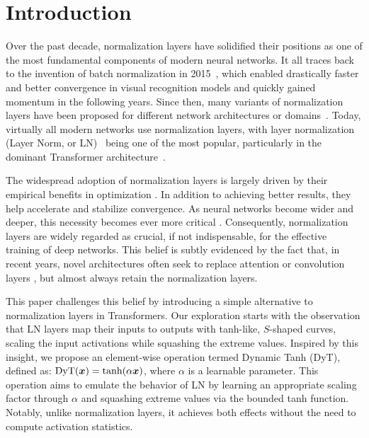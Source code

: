 




\section{Introduction}


Over the past decade, normalization layers have solidified their positions as one of the most fundamental components of modern neural networks.
It all traces back to the invention of batch normalization in 2015~\citep{ioffe2015batch}, which enabled drastically faster and better convergence in visual recognition models and quickly gained momentum in the following years.
Since then, many variants of normalization layers have been proposed for different network architectures or domains~\citep{ba2016layer,ulyanov2016instance,wu2018group,zhang2019root}.
Today, virtually all modern networks use normalization layers, with layer normalization (Layer Norm, or LN)~\citep{ba2016layer} being one of the most popular, particularly in the dominant Transformer architecture~\citep{vaswani2017attention, dosovitskiy2020image}.



The widespread adoption of normalization layers is largely driven by their empirical benefits in optimization \citep{santurkar2018does, bjorck2018understanding}.
In addition to achieving better results, they help accelerate and stabilize convergence.
As neural networks become wider and deeper, this necessity becomes ever more critical \citep{brock2021characterizing, huang2023normalization}.
Consequently, normalization layers are widely regarded as crucial, if not indispensable, for the effective training of deep networks.
This belief is subtly evidenced by the fact that, in recent years, novel architectures often seek to replace attention or convolution layers \citep{tolstikhin2021mlp,gu2023mamba, sun2024learning, feng2024were}, but almost always retain the normalization layers.


This paper challenges this belief by introducing a simple alternative to normalization layers in Transformers.
Our exploration starts with the observation that LN layers map their inputs to outputs with tanh-like, $S$-shaped curves,  scaling the input activations while squashing the extreme values.
Inspired by this insight, we propose an element-wise operation termed Dynamic Tanh (DyT), defined as: $\mathrm{DyT}({\bm{x}}) = \tanh(\alpha {\bm{x}})$, where $\alpha$ is a learnable parameter.
This operation aims to emulate the behavior of LN by learning an appropriate scaling factor through $\alpha$ and squashing extreme values via the bounded tanh function.
Notably, unlike normalization layers, it achieves both effects without the need to compute activation statistics.

